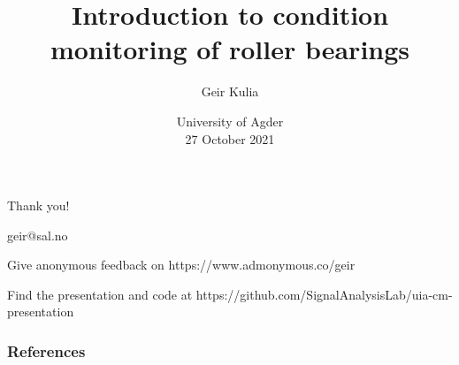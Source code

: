 \documentclass{beamer}
\title[Condition monitoring]{Introduction to condition monitoring of roller bearings}
\author{ Geir Kulia}
\date[UiA 27.10.21]{%
    University of Agder\\27 October 2021
}
\begin{document}

{
    \maketitle
}

% 















\begin{frame}
    \frametitle{}
    \centering
    
    Thank you!

    \vspace{0.5cm}
    geir@sal.no
    
    \vspace{0.5cm}
    
    Give anonymous feedback on
    https://www.admonymous.co/geir
    
    \vspace{0.5cm}
    Find the presentation and code at
    https://github.com/SignalAnalysisLab/uia-cm-presentation

\end{frame}

\begin{frame}
\frametitle{References}
\small

\end{frame}




\end{document}
